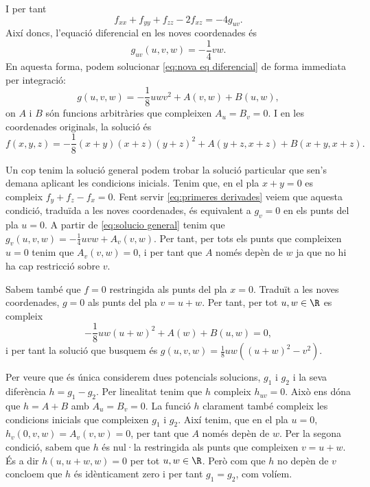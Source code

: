 I per tant 
\begin{equation}
  f_{xx} + f_{yy} + f_{zz} - 2f_{xz} = -4g_{uv}. 
\end{equation}
Així doncs, l'equació diferencial en les noves coordenades és 
\begin{equation}
  g_{uv}(u,v,w) = -\dfrac{1}{4}vw. \label{eq:nova eq diferencial}
\end{equation}
En aquesta forma, podem solucionar \ref{eq:nova eq diferencial} de forma immediata per integració:
\begin{equation}
  g(u,v,w) = -\dfrac{1}{8}uwv^2 + A(v,w) + B(u,w), \label{eq:solucio general}
\end{equation}
on \( A \) i \( B \) són funcions arbitràries que compleixen \( A_u = B_v = 0 \). I en les coordenades originals, la solució és
\begin{equation}
  f(x,y,z) = -\dfrac{1}{8}(x+y)(x+z)(y+z)^2 + A(y+z,x+z) + B(x+y,x+z).
\end{equation}

Un cop tenim la solució general podem trobar la solució particular que sen's demana aplicant les condicions inicials. Tenim que, en el pla \( x+y = 0 \) es compleix \( f_y + f_z - f_x = 0 \). Fent servir \ref{eq:primeres derivades} veiem que aquesta condició, traduïda a les noves coordenades, és equivalent a \( g_v = 0 \) en els punts del pla \( u = 0 \). A partir de \ref{eq:solucio general} tenim que \( g_v(u,v,w) = -\frac{1}{4}uvw + A_v(v,w) \). Per tant, per tots els punts que compleixen \( u = 0 \) tenim que \( A_v(v,w) = 0 \), i per tant que \( A \) només depèn de \( w \) ja que no hi ha cap restricció sobre \( v \).

Sabem també que \( f = 0 \) restringida als punts del pla \( x = 0 \). Traduït a les noves coordenades, \( g = 0 \) als punts del pla \( v = u + w \). Per tant, per tot \( u,w \in \R \) es compleix
\begin{equation*}
  -\dfrac{1}{8}uw(u+w)^2 + A(w) + B(u,w) = 0,
\end{equation*}
i per tant la solució que busquem és \( g(u,v,w) = \frac{1}{8}uw\left((u+w)^2 - v^2\right) \).

Per veure que és única considerem dues potencials solucions, \( g_1 \) i \( g_2 \) i la seva diferència \( h = g_1 -g_2 \). Per linealitat tenim que \( h \) compleix \( h_{uv} = 0 \). Això ens dóna que \( h = A + B	\) amb \( A_u = B_v = 0 \). La funció \( h \) clarament també compleix les condicions inicials que compleixen \( g_1 \) i \( g_2 \). Així tenim, que en el pla \( u = 0 \), \( h_v(0,v,w) = A_v(v,w) = 0 \), per tant que \( A \) només depèn de \( w \). Per la segona condició, sabem que \( h \) és nul·la restringida als punts que compleixen \( v = u + w \). És a dir \( h(u,u+w,w) = 0 \) per tot \( u,w \in \R \). Però com que \( h \) no depèn de \( v \) concloem que \( h \) és idènticament zero i per tant \( g_1 = g_2 \), com volíem.


